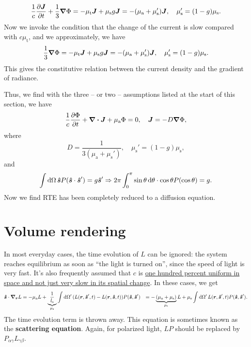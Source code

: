 \documentclass[hyperref, a4paper]{article}
\newcommand*{\concept}[1]{{\textbf{#1}}}
\def\\{}%
\begin{document}
\begin{equation}
    \frac{1}{c} \pdv{\vb*{J}}{t} + \frac{1}{3} \grad{\Phi}
    = - \mu_{\text{t}} \vb*{J} 
    + \mu_{\text{s}} g \vb*{J}
    = - (\mu_{\text{a}} + \mu_{\text{s}}') \vb*{J}, 
    \quad \mu_{\text{s}}' = (1 - g) \mu_{\text{s}}.
\end{equation}
Now we invoke the condition that the change of the current is slow 
compared with $c \mu_{\text{t}}$, 
and we approximately, we have 
\begin{equation}
    \frac{1}{3} \grad{\Phi}
    = - \mu_{\text{t}} \vb*{J} 
    + \mu_{\text{s}} g \vb*{J}
    = - (\mu_{\text{a}} + \mu_{\text{s}}') \vb*{J}, 
    \quad \mu_{\text{s}}' = (1 - g) \mu_{\text{s}}.
\end{equation}
This gives the constitutive relation between the current density 
and the gradient of radiance. 

Thus, we find with the three -- or two -- assumptions listed at the start of this section, 
we have 
\begin{equation}
    \frac{1}{c} \pdv{\Phi}{t} + \div{\vb*{J}} + \mu_{\text{a}} \Phi = 0, \quad 
    \vb*{J} = - D \grad{\Phi},
\end{equation}
where 
\begin{equation}
    D = \frac{1}{3 (\mu_{\text{a}} + \mu_{\text{s}}')}, \quad 
    \mu_{\text{s}}' = (1 - g) \mu_{\text{s}}, 
\end{equation}
and 
\begin{equation}
    \int \dd{\Omega} \vu*{s} P(\vu*{s} \cdot \vu*{s}') = g \vu*{s}'
    \Rightarrow 2 \pi \int_{0}^{\pi} \sin \theta \dd{\theta} \cdot \cos \theta P(\cos \theta)
    = g .
\end{equation}
Now we find RTE has been completely reduced to a diffusion equation.

\section{Volume rendering}

In most everyday cases, the time evolution of $L$ can be ignored: 
the system reaches equilibrium as soon as ``the light is turned on'', 
since the speed of light is very fast. 
It's also frequently assumed that $c$ is 
\ul{one hundred percent uniform in space
and not just very slow in its spatial change}. 
In these cases, we get 
\begin{equation}
    \begin{aligned}
        \vu*{s} \cdot \grad_{\vb*{r}} L &= 
        - \mu_{\text{a}} L +
        \underbrace{\frac{1}{l_{\text{s}}}}_{\mu_{\text{s}}} \int \dd{\Omega'} 
        (L(\vb*{r}, \vu*{s}', t) - L(\vb*{r}, \vu*{s}, t)) P(\vu*{s}, \vu*{s}') \\
        &= - \underbrace{(\mu_{\text{a}} + \mu_{\text{s}})}_{\mu_{\text{t}}} L 
        + \mu_{\text{s}} \int \dd{\Omega'} 
        L(\vb*{r}, \vu*{s}', t) P(\vu*{s}, \vu*{s}') .
    \end{aligned}
    \label{eq:se-final}
\end{equation}
The time evolution term is thrown away. 
This equation is sometimes known as the \concept{scattering equation}.
Again, for polarized light, $L P$ should be replaced by $P_{\alpha \gamma} L_{\gamma \beta}$.
\end{document}
